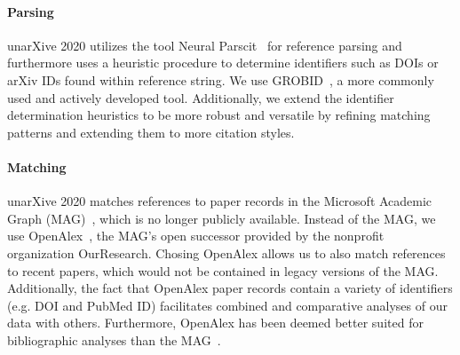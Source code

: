 \paragraph{Parsing} unarXive 2020 utilizes the tool Neural Parscit~\cite{neuralparscit} for reference parsing and furthermore uses a heuristic procedure to determine identifiers such as DOIs or arXiv IDs found within reference string. We use GROBID~\cite{Lopez2009}, a more commonly used and actively developed tool. Additionally, we extend the identifier determination heuristics to be more robust and versatile by refining matching patterns and extending them to more citation styles.

\paragraph{Matching} unarXive 2020 matches references to paper records in the Microsoft Academic Graph (MAG)~\cite{Sinha2015MAG}, which is no longer publicly available. Instead of the MAG, we use OpenAlex~\cite{openalex}, the MAG's open successor provided by the nonprofit organization OurResearch. Chosing OpenAlex allows us to also match references to recent papers, which would not be contained in legacy versions of the MAG. Additionally, the fact that OpenAlex paper records contain a variety of identifiers (e.g. DOI and PubMed ID) facilitates combined and comparative analyses of our data with others. Furthermore, OpenAlex has been deemed better suited for bibliographic analyses than the MAG~\cite{openalex-vs-mag}.




